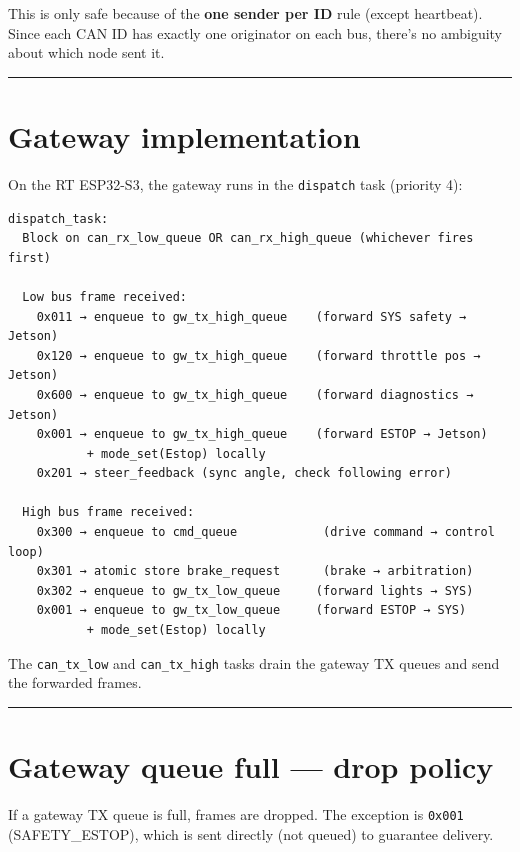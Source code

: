 \documentclass[12pt,a4paper,oneside]{report}
\begin{document}
This is only safe because of the \textbf{one sender per ID} rule (except
heartbeat). Since each CAN ID has exactly one originator on each bus, there's no
ambiguity about which node sent it.

\begin{center}\rule{0.5\linewidth}{0.5pt}\end{center}

\section{Gateway implementation}\label{gateway-implementation}

On the RT ESP32-S3, the gateway runs in the \texttt{dispatch} task (priority 4):

\begin{verbatim}
dispatch_task:
  Block on can_rx_low_queue OR can_rx_high_queue (whichever fires first)

  Low bus frame received:
    0x011 → enqueue to gw_tx_high_queue    (forward SYS safety → Jetson)
    0x120 → enqueue to gw_tx_high_queue    (forward throttle pos → Jetson)
    0x600 → enqueue to gw_tx_high_queue    (forward diagnostics → Jetson)
    0x001 → enqueue to gw_tx_high_queue    (forward ESTOP → Jetson)
           + mode_set(Estop) locally
    0x201 → steer_feedback (sync angle, check following error)

  High bus frame received:
    0x300 → enqueue to cmd_queue            (drive command → control loop)
    0x301 → atomic store brake_request      (brake → arbitration)
    0x302 → enqueue to gw_tx_low_queue     (forward lights → SYS)
    0x001 → enqueue to gw_tx_low_queue     (forward ESTOP → SYS)
           + mode_set(Estop) locally
\end{verbatim}

The \texttt{can\_tx\_low} and \texttt{can\_tx\_high} tasks drain the gateway TX
queues and send the forwarded frames.

\begin{center}\rule{0.5\linewidth}{0.5pt}\end{center}

\section{Gateway queue full --- drop
policy}\label{gateway-queue-full-drop-policy}

If a gateway TX queue is full, frames are dropped. The exception is
\texttt{0x001} (SAFETY\_ESTOP), which is sent directly (not queued) to guarantee
delivery.
\end{document}
